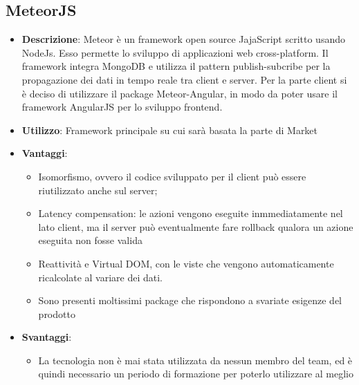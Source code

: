 \subsection{MeteorJS}
\begin{itemize}
	\item \textbf{Descrizione}: Meteor è un framework open source JajaScript scritto usando NodeJs. Esso permette lo sviluppo di applicazioni web cross-platform. Il framework integra MongoDB e utilizza il pattern publish-subcribe per la propagazione dei dati in tempo reale tra client e server. Per la parte client si è deciso di utilizzare il package Meteor-Angular, in modo da poter usare il framework AngularJS per lo sviluppo frontend.
	\item \textbf{Utilizzo}: Framework principale su cui sarà basata la parte di Market
	\item \textbf{Vantaggi}:
	\begin{itemize}
		\item Isomorfismo, ovvero il codice sviluppato per il client può essere riutilizzato anche sul server;
		\item Latency compensation: le azioni vengono eseguite inmmediatamente nel lato client, ma il server può eventualmente fare rollback qualora un azione eseguita non fosse valida
		\item Reattività e Virtual DOM, con le viste che vengono automaticamente ricalcolate al variare dei dati.
		\item Sono presenti moltissimi package che rispondono a svariate esigenze del prodotto
	\end{itemize}
	\item \textbf{Svantaggi}:
	\begin{itemize}
		\item La tecnologia non è mai stata utilizzata da nessun membro del team, ed è quindi necessario un periodo di formazione per poterlo utilizzare al meglio
	\end{itemize}
\end{itemize}


